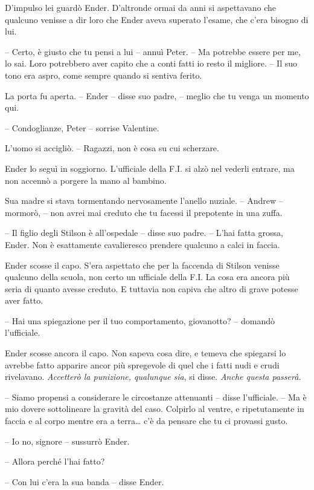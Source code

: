 {D'impulso lei guardò Ender. D'altronde ormai da anni si aspettavano che
	qualcuno venisse a dir loro che Ender aveva superato l'esame, che c'era
	bisogno di lui.}

{-- Certo, è giusto che tu pensi a lui -- annuì Peter. -- Ma potrebbe
	essere per me, lo sai. Loro potrebbero aver capito che a conti fatti io
	resto il migliore. -- Il suo tono era aspro, come sempre quando si
	sentiva ferito.}

{La porta fu aperta. -- Ender -- disse suo padre, -- meglio che tu venga
	un momento qui.}

{-- Condoglianze, Peter -- sorrise Valentine.}

{L'uomo si accigliò. -- Ragazzi, non è cosa su cui scherzare.}

{Ender lo seguì in soggiorno. L'ufficiale della F.I. si alzò nel vederli
	entrare, ma non accennò a porgere la mano al bambino.}

{Sua madre si stava tormentando nervosamente l'anello nuziale. -- Andrew
	-- mormorò, -- non avrei mai creduto che tu facessi il prepotente in una
	zuffa.}

{-- Il figlio degli Stilson è all'ospedale -- disse suo padre. -- L'hai
	fatta grossa, Ender. Non è esattamente cavalieresco prendere qualcuno a
	calci in faccia.}

{Ender scosse il capo. S'era aspettato che per la faccenda di Stilson
	venisse qualcuno della scuola, non certo un ufficiale della F.I. La cosa
	era ancora più seria di quanto avesse creduto. E tuttavia non capiva che
	altro di grave potesse aver fatto.}

{-- Hai una spiegazione per il tuo comportamento, giovanotto? -- domandò
	l'ufficiale.}

{Ender scosse ancora il capo. Non sapeva cosa dire, e temeva che
	spiegarsi lo avrebbe fatto apparire ancor più spregevole di quel che i
	fatti nudi e crudi rivelavano. \emph{Accetterò la punizione, qualunque
		sia}, \emph{} si disse. \emph{Anche questa passerà.}}

{-- Siamo propensi a considerare le circostanze attenuanti -- disse
	l'ufficiale. -- Ma è mio dovere sottolineare la gravità del caso.
	Colpirlo al ventre, e ripetutamente in faccia e al corpo mentre era a
	terra\ldots{} c'è da pensare che tu ci provassi gusto.}

{-- Io no, signore -- sussurrò Ender.}

{-- Allora perché l'hai fatto?}

{-- Con lui c'era la sua banda -- disse Ender.}

